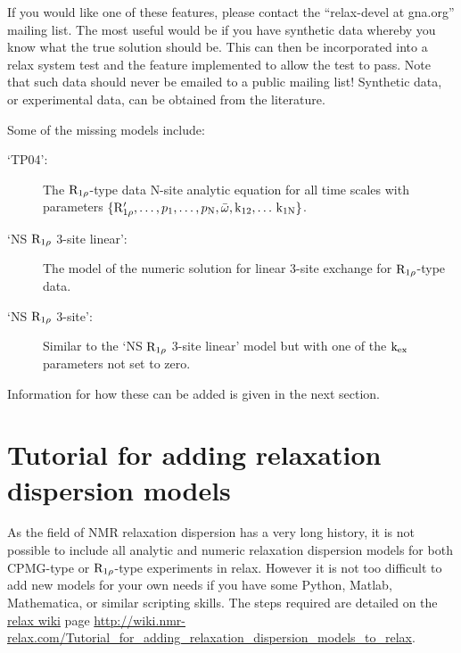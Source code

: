 If you would like one of these features, please contact the ``relax-devel at gna.org'' mailing list.
The most useful would be if you have synthetic data whereby you know what the true solution should be.
This can then be incorporated into a relax system test and the feature implemented to allow the test to pass.
Note that such data should never be emailed to a public mailing list!
Synthetic data, or experimental data, can be obtained from the literature.

Some of the missing models include:
\begin{description}
\item[`TP04':]  The $\mathrm{R}_{1\rho}$-type data \citet{TrottPalmer04} N-site analytic equation for all time scales with parameters $\{\mathrm{R}_{1\rho}', \dots, p_\textrm{1}, \dots, p_\textrm{N}, \bar\omega, \textrm{k}_\textrm{12}, \dots\, \textrm{k}_\textrm{1N}\}$.
\item[`NS $\mathrm{R}_{1\rho}$ 3-site linear':]  The model of the numeric solution for linear 3-site exchange for $\mathrm{R}_{1\rho}$-type data.
\item[`NS $\mathrm{R}_{1\rho}$ 3-site':]  Similar to the `NS $\mathrm{R}_{1\rho}$ 3-site linear' model but with one of the $\textrm{k}_\textrm{ex}$ parameters not set to zero.
\end{description}

Information for how these can be added is given in the next section.



\section{Tutorial for adding relaxation dispersion models}
\label{sect: dispersion: model tutorial}

As the field of NMR relaxation dispersion has a very long history, it is not possible to include all analytic and numeric relaxation dispersion models for both CPMG-type or $\mathrm{R}_{1\rho}$-type experiments in relax.  However it is not too difficult to add new models for your own needs if you have some Python, Matlab, Mathematica, or similar scripting skills.  The steps required are detailed on the \href{http://wiki.nmr-relax.com/}{relax wiki} page \url{http://wiki.nmr-relax.com/Tutorial\_for\_adding\_relaxation\_dispersion\_models\_to\_relax}.


